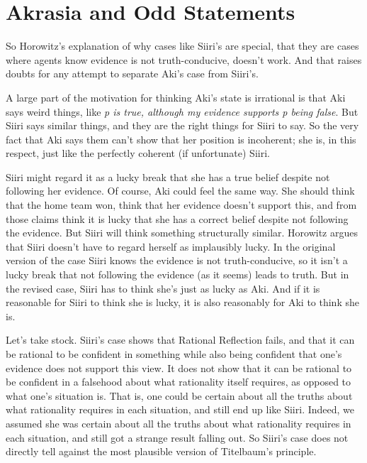 \documentclass[
  10pt,
  letterpaper,
  twoside]{scrbook}
\begin{document}
\section{Akrasia and Odd Statements}\label{akrasiaandoddstatements}

So Horowitz's explanation of why cases like {Siiri}'s are special, that
they are cases where agents know evidence is not truth-conducive,
doesn't work. And that raises doubts for any attempt to separate {Aki}'s
case from {Siiri}'s.

A large part of the motivation for thinking {Aki}'s state is irrational
is that {Aki} says weird things, like \emph{p is true, although my
evidence supports p being false}. But {Siiri} says similar things, and
they are the right things for {Siiri} to say. So the very fact that
{Aki} says them can't show that her position is incoherent; she is, in
this respect, just like the perfectly coherent (if unfortunate) {Siiri}.

{Siiri} might regard it as a lucky break that she has a true belief
despite not following her evidence. Of course, {Aki} could feel the same
way. She should think that the home team won, think that her evidence
doesn't support this, and from those claims think it is lucky that she
has a correct belief despite not following the evidence. But {Siiri}
will think something structurally similar. Horowitz argues that {Siiri}
doesn't have to regard herself as implausibly lucky. In the original
version of the case {Siiri} knows the evidence is not truth-conducive,
so it isn't a lucky break that not following the evidence (as it seems)
leads to truth. But in the revised case, {Siiri} has to think she's just
as lucky as {Aki}. And if it is reasonable for {Siiri} to think she is
lucky, it is also reasonably for {Aki} to think she is.

Let's take stock. {Siiri}'s case shows that Rational Reflection fails,
and that it can be rational to be confident in something while also
being confident that one's evidence does not support this view. It does
not show that it can be rational to be confident in a falsehood about
what rationality itself requires, as opposed to what one's situation is.
That is, one could be certain about all the truths about what
rationality requires in each situation, and still end up like {Siiri}.
Indeed, we assumed she was certain about all the truths about what
rationality requires in each situation, and still got a strange result
falling out. So {Siiri}'s case does not directly tell against the most
plausible version of Titelbaum's principle.
\end{document}
